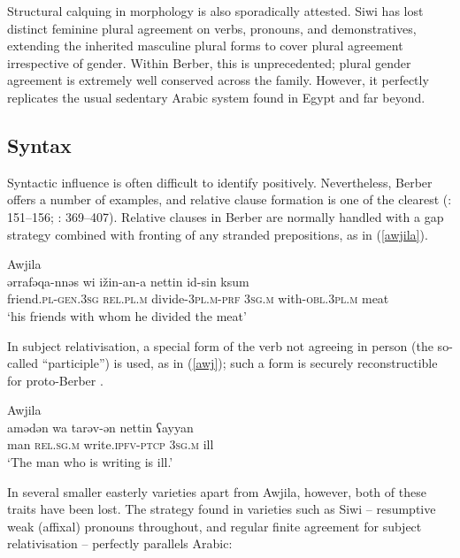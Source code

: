 \documentclass[output=paper]{langsci/langscibook}
\begin{document}
Structural calquing in morphology is also sporadically attested. Siwi has lost distinct feminine plural agreement on verbs, pronouns, and demonstratives, extending the inherited masculine plural forms to cover plural agreement irrespective of gender. Within Berber, this is unprecedented; plural gender agreement is extremely well conserved across the family. However, it perfectly replicates the usual sedentary Arabic system found in Egypt and far beyond.


 
 \subsection{Syntax}


Syntactic influence is often difficult to identify positively.  Nevertheless, Berber offers a number of examples, and relative clause formation is one of the clearest (\citealt{Souag2013book}: 151–156; \citealt{Kossmann2013book}: 369–407). Relative clauses in Berber are normally handled with a gap strategy combined with fronting of any stranded prepositions, as in ‎(\ref{awjila}).

\ea
{Awjila \citep[79]{Paradisi1961}}\\ \label{awjila}
\gll ərrafəqa-nnəs wi ižin-an-a nettin id-sin ksum\\
     friend\textsc{.pl}{}-\textsc{gen.}\textsc{3sg} \textsc{rel.pl.m} divide-\textsc{3pl.m-prf} 3\textsc{sg.m} with-\textsc{obl.}3\textsc{pl}.\textsc{m} meat\\
\glt `his friends with whom he divided the meat'
\z

In subject relativisation, a special form of the verb not agreeing in person (the so-called “participle”) is used, as in (\ref{awj}); such a form is securely reconstructible for proto-Berber \citep{Kossmann2003}. 

\ea \label{awj}
{Awjila \citep[162]{Paradisi1960}}\\
\gll amədən wa tarəv-ən nettin ʕayyan\\
     man \textsc{rel.sg.m} write.\textsc{ipfv-ptcp} \textsc{3sg.m} ill\\
\glt `The man who is writing is ill.'
\z

In several smaller easterly varieties apart from Awjila, however, both of these traits have been lost. The strategy found in varieties such as Siwi – resumptive weak (affixal) pronouns throughout, and regular finite agreement for subject relativisation – perfectly parallels Arabic: 
\end{document}
